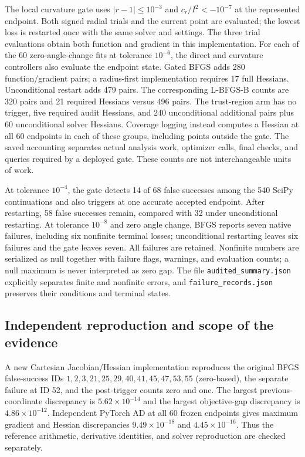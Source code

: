 \documentclass[10pt,a4paper]{article}
\begin{document}
The local curvature gate uses $|r-1|\leq10^{-3}$ and $c_r/I^2<-10^{-7}$ at the represented endpoint. Both signed radial trials and the current point are evaluated; the lowest loss is restarted once with the same solver and settings. The three trial evaluations obtain both function and gradient in this implementation. For each of the 60 zero-angle-change fits at tolerance $10^{-6}$, the direct and curvature controllers also evaluate the endpoint state. Gated BFGS adds 280 function/gradient pairs; a radius-first implementation requires 17 full Hessians. Unconditional restart adds 479 pairs. The corresponding L-BFGS-B counts are 320 pairs and 21 required Hessians versus 496 pairs. The trust-region arm has no trigger, five required audit Hessians, and 240 unconditional additional pairs plus 60 unconditional solver Hessians. Coverage logging instead computes a Hessian at all 60 endpoints in each of these groups, including points outside the gate. The saved accounting separates actual analysis work, optimizer calls, final checks, and queries required by a deployed gate. These counts are not interchangeable units of work.

At tolerance $10^{-4}$, the gate detects 14 of 68 false successes among the 540 SciPy continuations and also triggers at one accurate accepted endpoint. After restarting, 58 false successes remain, compared with 32 under unconditional restarting. At tolerance $10^{-8}$ and zero angle change, BFGS reports seven native failures, including six nonfinite terminal losses; unconditional restarting leaves six failures and the gate leaves seven. All failures are retained. Nonfinite numbers are serialized as null together with failure flags, warnings, and evaluation counts; a null maximum is never interpreted as zero gap. The file \nolinkurl{audited_summary.json} explicitly separates finite and nonfinite errors, and \nolinkurl{failure_records.json} preserves their conditions and terminal states.

\subsection{Independent reproduction and scope of the evidence}
A new Cartesian Jacobian/Hessian implementation reproduces the original BFGS false-success IDs $1,2,3,21,25,29,40,41,45,47,53,55$ (zero-based), the separate failure at ID 52, and the post-trigger counts zero and one. The largest previous-coordinate discrepancy is $5.62\times10^{-14}$ and the largest objective-gap discrepancy is $4.86\times10^{-12}$. Independent PyTorch AD at all 60 frozen endpoints gives maximum gradient and Hessian discrepancies $9.49\times10^{-18}$ and $4.45\times10^{-16}$. Thus the reference arithmetic, derivative identities, and solver reproduction are checked separately.
\end{document}
